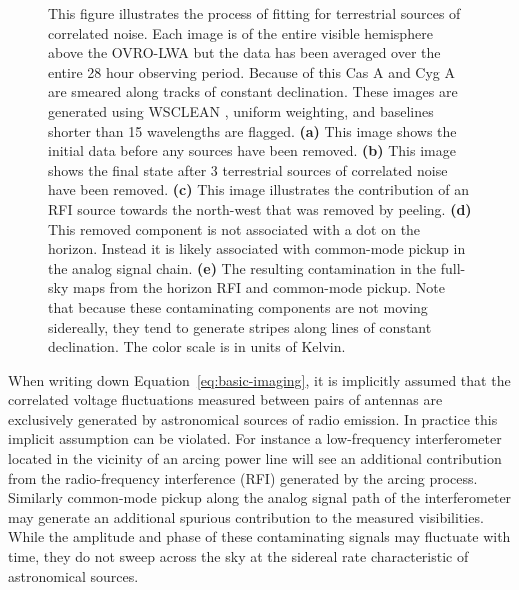 \documentclass[twocolumn]{aastex61}
\begin{document}
\begin{figure}[p]
    \caption{
        This figure illustrates the process of fitting for terrestrial sources of correlated noise.
        Each image is of the entire visible hemisphere above the OVRO-LWA but the data has been
        averaged over the entire 28 hour observing period. Because of this Cas A and Cyg A are
        smeared along tracks of constant declination. These images are generated using WSCLEAN
        \citep{2014MNRAS.444..606O}, uniform weighting, and baselines shorter than 15 wavelengths
        are flagged. \textbf{(a)} This image shows the initial data before any sources have been
        removed. \textbf{(b)} This image shows the final state after 3 terrestrial sources of
        correlated noise have been removed. \textbf{(c)} This image illustrates the contribution of
        an RFI source towards the north-west that was removed by peeling. \textbf{(d)} This removed
        component is not associated with a dot on the horizon.  Instead it is likely associated with
        common-mode pickup in the analog signal chain. \textbf{(e)} The resulting contamination in
        the full-sky maps from the horizon RFI and common-mode pickup. Note that because these
        contaminating components are not moving sidereally, they tend to generate stripes along
        lines of constant declination. The color scale is in units of Kelvin.
    }
    \label{fig:fitrfi}
\end{figure}

When writing down Equation~\ref{eq:basic-imaging}, it is implicitly assumed that the correlated
voltage fluctuations measured between pairs of antennas are exclusively generated by astronomical
sources of radio emission. In practice this implicit assumption can be violated. For instance a
low-frequency interferometer located in the vicinity of an arcing power line will see an additional
contribution from the radio-frequency interference (RFI) generated by the arcing process. Similarly
common-mode pickup along the analog signal path of the interferometer may generate an additional
spurious contribution to the measured visibilities. While the amplitude and phase of these
contaminating signals may fluctuate with time, they do not sweep across the sky at the sidereal rate
characteristic of astronomical sources.
\end{document}
